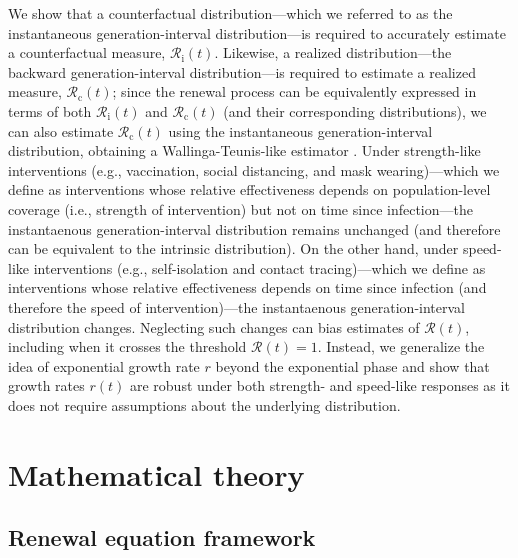 \documentclass[12pt]{article}
\newcommand{\Rx}[1]{\ensuremath{{\mathcal R}_{#1}}\xspace}
\newcommand{\Rc}{\Rx{\mathrm{c}}}
\newcommand{\Ri}{\Rx{\mathrm{i}}}
\newcommand{\RR}{\ensuremath{{\mathcal R}}\xspace}
\begin{document}
We show that a counterfactual distribution---which we referred to as the instantaneous generation-interval distribution---is required to accurately estimate a counterfactual measure, $\Ri(t)$.
Likewise, a realized distribution---the backward generation-interval distribution---is required to estimate a realized measure, $\Rc(t)$;
since the renewal process can be equivalently expressed in terms of both $\Ri(t)$ and $\Rc(t)$ (and their corresponding distributions), we can also estimate $\Rc(t)$ using the instantaneous generation-interval distribution, obtaining a Wallinga-Teunis-like estimator \citep{wallinga2004different}.
Under strength-like interventions (e.g., vaccination, social distancing, and mask wearing)---which we define as interventions whose relative effectiveness depends on population-level coverage (i.e., strength of intervention) but not on time since infection---the instantaenous generation-interval distribution remains unchanged (and therefore can be equivalent to the intrinsic distribution).
On the other hand, under speed-like interventions (e.g., self-isolation and contact tracing)---which we define as interventions whose relative effectiveness depends on time since infection (and therefore the speed of intervention)---the instantaenous generation-interval distribution changes.
Neglecting such changes can bias estimates of $\RR(t)$, including when it crosses the threshold $\RR(t)=1$.
Instead, we generalize the idea of exponential growth rate $r$ beyond the exponential phase and show that growth rates $r(t)$ are robust under both strength- and speed-like responses as it does not require assumptions about the underlying distribution.

\section{Mathematical theory}

\subsection{Renewal equation framework}
\end{document}
